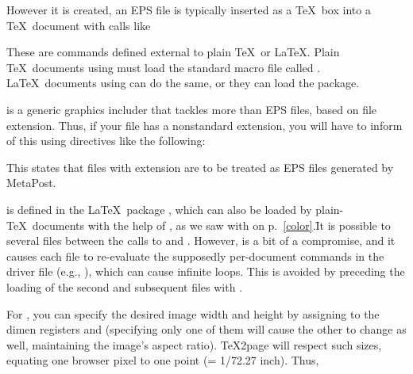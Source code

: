 {{{{{{{{{{{{{{

However it is created, an EPS file is typically
inserted as a \TeX\ box into a \TeX\ document with calls
like



\n These are commands defined external to plain \TeX\ or \LaTeX.
Plain \TeX\
documents using \p{\epsfbox} must load the standard
macro file called .
\LaTeX\ documents using \p{\epsfbox} can do the
same, or they can load the  package.


 is a generic graphics includer that tackles more than
EPS files, based on file extension.  Thus, if your file has a
nonstandard extension, you
will have to inform  of this using directives like the
following:


\n This states that files with extension  are to be treated as EPS
files generated by MetaPost.


 is defined in the \LaTeX\ package ,
which can also be loaded by
plain-\TeX\ documents with the help of , as we saw
with \p{color.sty} on p.~\ref{color}.\f{It is possible to \p{}
several  files between the calls to \p{}  and
\p{\resetatcatcode}.  However, \p{miniltx} is a bit of a compromise, and it
causes each \p{.sty} file to re-evaluate the supposedly per-document commands
in the driver file
(e.g., ), which can cause infinite loops.  This is avoided by
preceding the loading of the second and subsequent \p{.sty}
files with \p{\let\color\@ldc@l@r}.}

\p{


\resetatcatcode
}


\n For \p{\epsfbox}, you can specify the desired image
width and height by assigning to the dimen
registers \p{\epsfxsize} and \p{\epsfysize}
(specifying only one of them will cause the other to
change as well, maintaining the image’s aspect ratio).
\TeX2page will respect such sizes, equating one browser
pixel to one point (= 1/72.27 inch).  Thus,

}}}}}}}}}}}}}}
